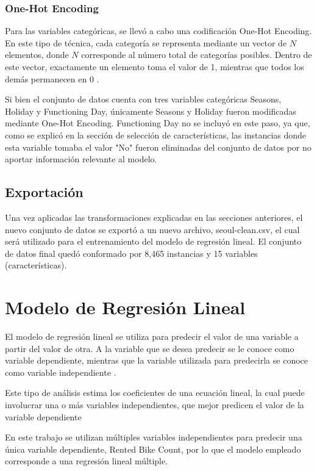 \documentclass[10pt,journal,compsoc]{IEEEtran}
\begin{document}
\subsubsection{One-Hot Encoding}
Para las variables categóricas, se llevó a cabo una codificación One-Hot Encoding. En este tipo de técnica, cada categoría se representa mediante un vector de $N$ elementos, donde $N$ corresponde al número total de categorías posibles. Dentro de este vector, exactamente un elemento toma el valor de 1, mientras que todos los demás permanecen en 0 \cite{onehot}.

Si bien el conjunto de datos cuenta con tres variables categóricas Seasons, Holiday y Functioning Day, únicamente Seasons y Holiday fueron modificadas mediante One-Hot Encoding. Functioning Day no se incluyó en este paso, ya que, como se explicó en la sección de selección de características, las instancias donde esta variable tomaba el valor "No" fueron eliminadas del conjunto de datos por no aportar información relevante al modelo. 

\subsection{Exportación}
Una vez aplicadas las transformaciones explicadas en las secciones anteriores, el nuevo conjunto de datos se exportó a un nuevo archivo, seoul-clean.csv, el cual será utilizado para el entrenamiento del modelo de regresión lineal. El conjunto de datos final quedó conformado por 8,465 instancias y 15 variables (características). 

\section{Modelo de Regresión Lineal}
El modelo de regresión lineal se utiliza para predecir el valor de una variable a partir del valor de otra. A la variable que se desea predecir se le conoce como variable dependiente, mientras que la variable utilizada para predecirla se conoce como variable independiente \cite{ibm_regresion}. 

Este tipo de análisis estima los coeficientes de una ecuación lineal, la cual puede involucrar una o más variables independientes, que mejor predicen el valor de la variable dependiente \cite{ibm_regresion}

En este trabajo se utilizan múltiples variables independientes para predecir una única variable dependiente, Rented Bike Count, por lo que el modelo empleado corresponde a una regresión lineal múltiple.
\end{document}
